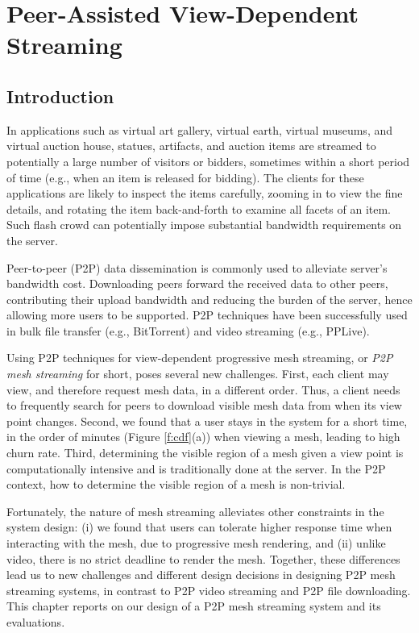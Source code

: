 \chapter{Peer-Assisted View-Dependent Streaming}
\label{c:p2p}
\section{Introduction}
    In applications such as virtual art gallery, virtual
    earth, virtual museums, and virtual auction house,
    statues, artifacts, and auction items are streamed to
    potentially a large number of visitors or bidders,
    sometimes within a short period of time (e.g., when an
    item is released for bidding).  The clients for these
    applications are likely to inspect the items carefully,
    zooming in to view the fine details, and rotating the
    item back-and-forth to examine all facets of an item.
    Such flash crowd can potentially impose substantial
    bandwidth requirements on the server.

    Peer-to-peer (P2P) data dissemination is commonly used to
    alleviate server's bandwidth cost.  Downloading
    peers forward the received data to other peers,
    contributing their upload bandwidth and reducing the
    burden of the server, hence allowing more users to
    be supported.  P2P techniques have been successfully used 
    in bulk file transfer (e.g., BitTorrent) and video
    streaming (e.g., PPLive).

    Using P2P techniques for view-dependent progressive mesh
    streaming, or \textit{P2P mesh streaming} for short, poses 
    several new challenges.  First, each
    client may view, and therefore request mesh data, in a 
    different order.
    Thus, a client needs
    to frequently search for peers to download visible mesh
    data from when its view point changes.  Second, we
    found that a user stays in the system for a short time,
    in the order of minutes
    (Figure \ref{f:cdf}(a))
    when viewing a mesh, leading to high churn rate.  Third,
    determining the visible region of a mesh given a view
    point is computationally intensive and is
    traditionally done at the server.  In the P2P context,
    how to determine the visible region of a mesh is
    non-trivial.

    Fortunately, the nature of mesh streaming alleviates
    other constraints in the system design:  (i) we found
    that users can tolerate higher response time when
    interacting with the mesh, due to progressive mesh rendering, 
    and (ii) unlike video, there is no strict 
    deadline to render the mesh.
    Together, these differences 
    lead us to new challenges and different design decisions in 
    designing P2P mesh streaming systems, in contrast to P2P
    video streaming and P2P file downloading.  This chapter
    reports on our design of a P2P mesh streaming system and
    its evaluations.

